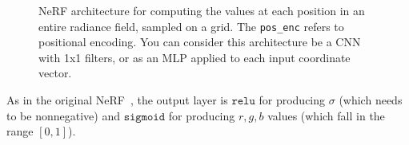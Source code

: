 \begin{figure}
{
    }
    \caption{NeRF architecture for computing the values at each position in an entire radiance field, sampled on a grid. The \texttt{pos\_enc} refers to positional encoding. You can consider this architecture be a CNN with 1x1 filters, or as an MLP applied to each input coordinate vector.}
    \label{fig:nerfs:image_to_image_arch}
\end{figure}



As in the original NeRF~\cite{mildenhall2020nerf}, the output layer is $\texttt{relu}$ for producing $\sigma$ (which needs to be nonnegative) and $\texttt{sigmoid}$ for producing $r,g,b$ values (which fall in the range $[0,1]$).

